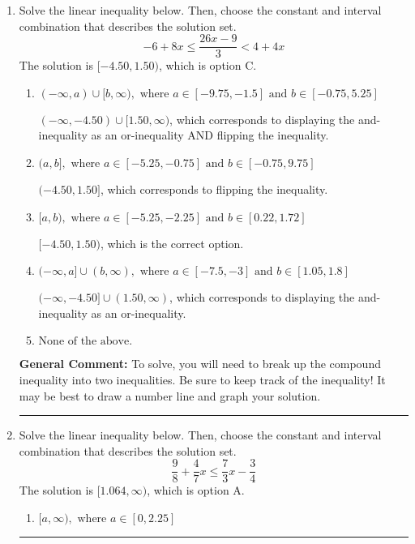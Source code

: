 \documentclass{extbook}[14pt]
\newcommand{\litem}[1]{\item #1

\rule{\textwidth}{0.4pt}}
\begin{document}
\begin{enumerate}
{\begin{enumerate}[label=\Alph*.]
* $(-20.00, -3.56]$, which is the correct option.
\item \( \text{None of the above.} \)


\end{enumerate}

\textbf{General Comment:} To solve, you will need to break up the compound inequality into two inequalities. Be sure to keep track of the inequality! It may be best to draw a number line and graph your solution.
}
\litem{
Solve the linear inequality below. Then, choose the constant and interval combination that describes the solution set.
\[ -6 + 8 x \leq \frac{26 x - 9}{3} < 4 + 4 x \]The solution is \( [-4.50, 1.50) \), which is option C.\begin{enumerate}[label=\Alph*.]
\item \( (-\infty, a) \cup [b, \infty), \text{ where } a \in [-9.75, -1.5] \text{ and } b \in [-0.75, 5.25] \)

$(-\infty, -4.50) \cup [1.50, \infty)$, which corresponds to displaying the and-inequality as an or-inequality AND flipping the inequality.
\item \( (a, b], \text{ where } a \in [-5.25, -0.75] \text{ and } b \in [-0.75, 9.75] \)

$(-4.50, 1.50]$, which corresponds to flipping the inequality.
\item \( [a, b), \text{ where } a \in [-5.25, -2.25] \text{ and } b \in [0.22, 1.72] \)

$[-4.50, 1.50)$, which is the correct option.
\item \( (-\infty, a] \cup (b, \infty), \text{ where } a \in [-7.5, -3] \text{ and } b \in [1.05, 1.8] \)

$(-\infty, -4.50] \cup (1.50, \infty)$, which corresponds to displaying the and-inequality as an or-inequality.
\item \( \text{None of the above.} \)


\end{enumerate}

\textbf{General Comment:} To solve, you will need to break up the compound inequality into two inequalities. Be sure to keep track of the inequality! It may be best to draw a number line and graph your solution.
}
\litem{
Solve the linear inequality below. Then, choose the constant and interval combination that describes the solution set.
\[ \frac{9}{8} + \frac{4}{7} x \leq \frac{7}{3} x - \frac{3}{4} \]The solution is \( [1.064, \infty) \), which is option A.\begin{enumerate}[label=\Alph*.]
\item \( [a, \infty), \text{ where } a \in [0, 2.25] \)


\end{enumerate}}
\end{enumerate}
\end{document}

